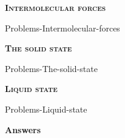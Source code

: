 \documentclass[main.tex]{subfiles}
\newcommand\chapterlabel{Ch-solids}
\begin{document}
\newpage
 
\fancyhfoffset[E,O]{0pt}
\setlength{\columnsep}{30pt}
\begin{conclusion}
\end{conclusion}
\begin{multicols*}{2}\setcounter{numA}{1}


{\raggedright\textsc{\textbf{Intermolecular forces }}\par}
{Problems-Intermolecular-forces}

{\raggedright\textsc{\textbf{The solid state }}\par}
{Problems-The-solid-state}
{\raggedright\textsc{\textbf{Liquid state }}\par}
{Problems-Liquid-state}




\end{multicols*}
\newpage
\begin{answersenvironment}
\begin{minipage}[c]{1\textwidth}
\begin{localsize}{10}
{\Large \bf Answers}
\printsolutions[byID={1,3,5,7,9,11,13,15,17, 19,21,23,25,27, 29}]
\end{localsize}
\end{minipage}\end{answersenvironment}
\end{document}
